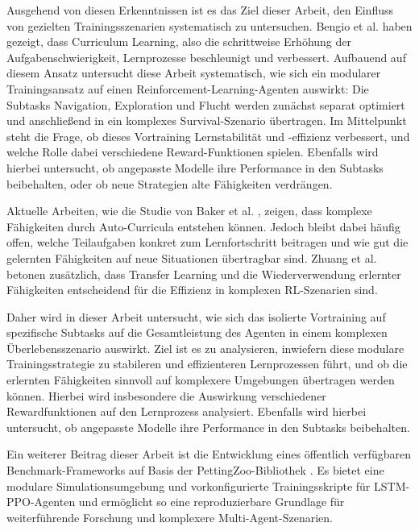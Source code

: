 Ausgehend von diesen Erkenntnissen ist es das Ziel dieser Arbeit, den Einfluss von gezielten Trainingsszenarien systematisch zu untersuchen. Bengio et al. \cite{10.1145/1553374.1553380} haben gezeigt, dass Curriculum Learning, also die schrittweise Erhöhung der Aufgabenschwierigkeit, Lernprozesse beschleunigt und verbessert. Aufbauend auf diesem Ansatz untersucht diese Arbeit systematisch, wie sich ein modularer Trainingsansatz auf einen Reinforcement-Learning-Agenten auswirkt: Die Subtasks Navigation, Exploration und Flucht werden zunächst separat optimiert und anschließend in ein komplexes Survival-Szenario übertragen. Im Mittelpunkt steht die Frage, ob dieses Vortraining Lernstabilität und -effizienz verbessert, und welche Rolle dabei verschiedene Reward-Funktionen spielen. Ebenfalls wird hierbei untersucht, ob angepasste Modelle ihre Performance in den Subtasks beibehalten, oder ob neue Strategien alte Fähigkeiten verdrängen.

Aktuelle Arbeiten, wie die Studie von Baker et al. \cite{baker2020emergenttoolusemultiagent}, zeigen, dass komplexe Fähigkeiten durch Auto-Curricula entstehen können. Jedoch bleibt dabei häufig offen, welche Teilaufgaben konkret zum Lernfortschritt beitragen und wie gut die gelernten Fähigkeiten auf neue Situationen übertragbar sind. Zhuang et al. \cite{zhuang2020comprehensivesurveytransferlearning} betonen zusätzlich, dass Transfer Learning und die Wiederverwendung erlernter Fähigkeiten entscheidend für die Effizienz in komplexen RL-Szenarien sind.

Daher wird in dieser Arbeit untersucht, wie sich das isolierte Vortraining auf spezifische Subtasks auf die Gesamtleistung des Agenten in einem komplexen Überlebensszenario auswirkt. Ziel ist es zu analysieren, inwiefern diese modulare Trainingsstrategie zu stabileren und effizienteren Lernprozessen führt, und ob die erlernten Fähigkeiten sinnvoll auf komplexere Umgebungen übertragen werden können. Hierbei wird insbesondere  die Auswirkung verschiedener Rewardfunktionen auf den Lernprozess analysiert. Ebenfalls wird hierbei untersucht, ob angepasste Modelle ihre Performance in den Subtasks beibehalten.

Ein weiterer Beitrag dieser Arbeit ist die Entwicklung eines öffentlich verfügbaren Benchmark-Frameworks auf Basis der PettingZoo-Bibliothek \cite{Terry_PettingZoo_Gym_for}. Es bietet eine modulare Simulationsumgebung und vorkonfigurierte Trainingsskripte für LSTM-PPO-Agenten und ermöglicht so eine reproduzierbare Grundlage für weiterführende Forschung und komplexere Multi-Agent-Szenarien.

